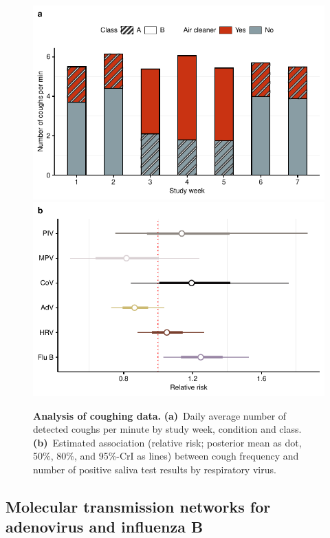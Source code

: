 \documentclass[fleqn,11pt]{wlscirep}
\begin{document}
\begin{figure}[!htpb]
    \centering
    \includegraphics{results/cough-data/coughs-frequency-per-week.pdf}
    \includegraphics{results/cough-data/coughs-virus-association.pdf}
    \caption{\textbf{Analysis of coughing data.} \textbf{(a)}~Daily average number of detected coughs per minute by study week, condition and class. \textbf{(b)}~Estimated association (relative risk; posterior mean as dot, 50\%, 80\%, and 95\%-CrI as lines) between cough frequency and number of positive saliva test results by respiratory virus.}
    \label{fig:coughing}
\end{figure}

\subsection{Molecular transmission networks for adenovirus and influenza B}
\end{document}
